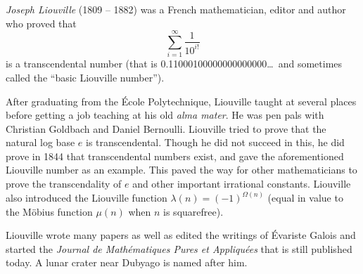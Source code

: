 \documentclass[12pt]{article}
\begin{document}

{\em Joseph Liouville} (1809 -- 1882) was a French mathematician, editor and author who proved that $$\sum_{i = 1}^\infty \frac{1}{10^{i!}}$$ is a transcendental number (that is 0.11000100000000000000\ldots\, and sometimes called the ``basic Liouville number'').

After graduating from the \'Ecole Polytechnique, Liouville taught at several places before getting a job teaching at his old {\em alma mater}.  He was pen pals with Christian Goldbach and Daniel Bernoulli. Liouville tried to prove that the natural log base $e$ is transcendental.  Though he did not succeed in this, he did prove in 1844 that transcendental numbers exist, and gave the aforementioned Liouville number as an example. This paved the way for other mathematicians to prove the transcendality of $e$ and other important irrational constants. Liouville also introduced the Liouville function $\lambda(n) = (-1)^{\Omega(n)}$ (equal in value to the M\"obius function $\mu(n)$ when $n$ is squarefree).

Liouville wrote many papers as well as edited the writings of \'Evariste Galois and started the {\it Journal de Math\'ematiques Pures et Appliqu\'ees} that is still published today. A lunar crater near Dubyago is named after him.
\end{document}
